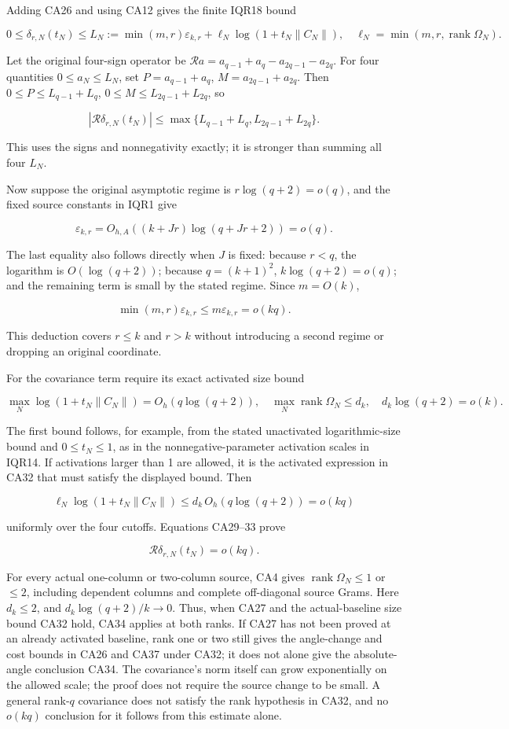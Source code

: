 \documentclass[11pt]{article}
\begin{document}
Adding CA26 and using CA12 gives the finite IQR18 bound

\[
0\le\delta_{r,N}(t_N)\le
L_N:=\min(m,r)\varepsilon_{k,r}
+\ell_N\log(1+t_N\|C_N\|),
\quad \ell_N=\min(m,r,\operatorname{rank}\Omega_N).
\tag{CA28}
\]

Let the original four-sign operator be \(\mathcal Ra=a_{q-1}+a_q-a_{2q-1}-a_{2q}\). For four quantities \(0\le a_N\le L_N\), set \(P=a_{q-1}+a_q\), \(M=a_{2q-1}+a_{2q}\). Then \(0\le P\le L_{q-1}+L_q\), \(0\le M\le L_{2q-1}+L_{2q}\), so

\[
|\mathcal R\delta_{r,N}(t_N)|
\le\max\{L_{q-1}+L_q,L_{2q-1}+L_{2q}\}.
\tag{CA29}
\]

This uses the signs and nonnegativity exactly; it is stronger than summing all four \(L_N\).

Now suppose the original asymptotic regime is \(r\log(q+2)=o(q)\), and the fixed source constants in IQR1 give

\[
\varepsilon_{k,r}=O_{h,A}((k+Jr)\log(q+Jr+2))=o(q).
\tag{CA30}
\]

The last equality also follows directly when \(J\) is fixed: because \(r<q\), the logarithm is \(O(\log(q+2))\); because \(q=(k+1)^2\), \(k\log(q+2)=o(q)\); and the remaining term is small by the stated regime. Since \(m=O(k)\),

\[
\min(m,r)\varepsilon_{k,r}\le m\varepsilon_{k,r}=o(kq).
\tag{CA31}
\]

This deduction covers \(r\le k\) and \(r>k\) without introducing a second regime or dropping an original coordinate.

For the covariance term require its exact activated size bound

\[
\max_N\log(1+t_N\|C_N\|)=O_h(q\log(q+2)),
\quad \max_N\operatorname{rank}\Omega_N\le d_k,
\quad d_k\log(q+2)=o(k).
\tag{CA32}
\]

The first bound follows, for example, from the stated unactivated logarithmic-size bound and \(0\le t_N\le1\), as in the nonnegative-parameter activation scales in IQR14. If activations larger than 1 are allowed, it is the activated expression in CA32 that must satisfy the displayed bound. Then

\[
\ell_N\log(1+t_N\|C_N\|)
\le d_k\,O_h(q\log(q+2))=o(kq)
\tag{CA33}
\]

uniformly over the four cutoffs. Equations CA29--33 prove

\[
\mathcal R\delta_{r,N}(t_N)=o(kq).
\tag{CA34}
\]

For every actual one-column or two-column source, CA4 gives \(\operatorname{rank}\Omega_N\le1\) or \(\le2\), including dependent columns and complete off-diagonal source Grams. Here \(d_k\le2\), and \(d_k\log(q+2)/k\to0\). Thus, when CA27 and the actual-baseline size bound CA32 hold, CA34 applies at both ranks. If CA27 has not been proved at an already activated baseline, rank one or two still gives the angle-change and cost bounds in CA26 and CA37 under CA32; it does not alone give the absolute-angle conclusion CA34. The covariance's norm itself can grow exponentially on the allowed scale; the proof does not require the source change to be small. A general rank-\(q\) covariance does not satisfy the rank hypothesis in CA32, and no \(o(kq)\) conclusion for it follows from this estimate alone.
\end{document}
